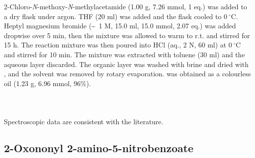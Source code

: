 2-Chloro-\textit{N}-methoxy-\textit{N}-methylacetamide  (1.00 g, 7.26 mmol, 1 eq.) was added to a dry flask under argon. THF (20 ml) was added and the flask cooled to $0\ ^{\circ}$C. Heptyl magnesium bromide  (\textasciitilde ~1 M, 15.0 ml, 15.0 mmol, 2.07 eq.) was added dropwise over 5 min, then the mixture was allowed to warm to r.t. and stirred for 15 h. The reaction mixture was then poured into HCl (aq., 2 N, 60 ml) at $0\ ^{\circ}$C and stirred for 10 min. The mixture was extracted with toluene (30 ml) and the aqueous layer discarded. The organic layer was washed with brine and dried with , and the solvent was removed by rotary evaporation.  was obtained as a colourless oil (1.23 g, 6.96 mmol, 96\%).
\\[1\baselineskip]
\\[1\baselineskip]
\\[1\baselineskip]
\\[1\baselineskip]
Spectroscopic data are consistent with the literature\cite{Hodgkinson2011}.


\subsection{2-Oxononyl 2-amino-5-nitrobenzoate }

